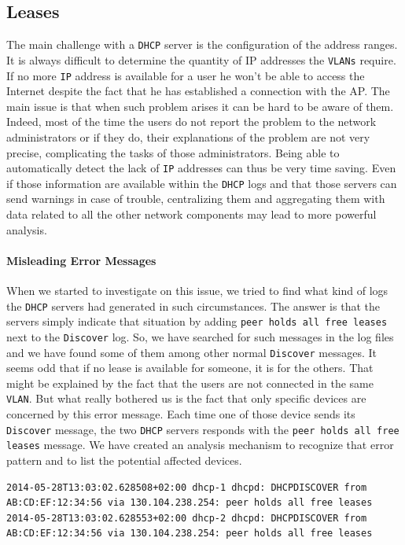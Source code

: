 \subsection{Leases}
The main challenge with a \texttt{DHCP} server is the configuration of the address ranges. It is always difficult to determine the quantity of IP addresses the \texttt{VLANs} require. If no more \texttt{IP} address is available for a user he won't be able to access the Internet despite the fact that he has established a connection with the AP. The main issue is that when such problem arises it can be hard to be aware of them. Indeed, most of the time the users do not report the problem to the network administrators or if they do, their explanations of the problem are not very precise, complicating the tasks of those administrators. Being able to automatically detect the lack of \texttt{IP} addresses can thus be very time saving. Even if those information are available within the \texttt{DHCP} logs and that those servers can send warnings in case of trouble, centralizing them and aggregating them with data related to all the other network components may lead to more powerful analysis.

\paragraph*{Misleading Error Messages} When we started to investigate on this issue, we tried to find what kind of logs the \texttt{DHCP} servers had generated in such circumstances. The answer is that the servers simply indicate that situation by adding \texttt{peer holds all free leases} next to the \texttt{Discover} log. So, we have searched for such messages in the log files and we have found some of them among other normal \texttt{Discover} messages. It seems odd that if no lease is available for someone, it is for the others. That might be explained by the fact that the users are not connected in the same \texttt{VLAN}. But what really bothered us is the fact that only specific devices are concerned by this error message. Each time one of those device sends its \texttt{Discover} message, the two \texttt{DHCP} servers responds with the \texttt{peer holds all free leases} message. We have created an analysis mechanism to recognize that error pattern and to list the potential affected devices. \\

\begin{lstlisting}[frame=single,breaklines=true,caption={Misleading Error Message}]
2014-05-28T13:03:02.628508+02:00 dhcp-1 dhcpd: DHCPDISCOVER from AB:CD:EF:12:34:56 via 130.104.238.254: peer holds all free leases
2014-05-28T13:03:02.628553+02:00 dhcp-2 dhcpd: DHCPDISCOVER from AB:CD:EF:12:34:56 via 130.104.238.254: peer holds all free leases
\end{lstlisting}


